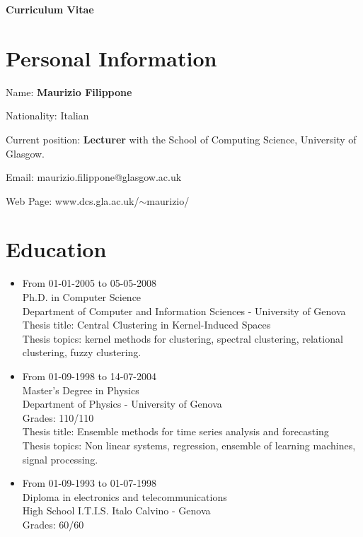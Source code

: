 \documentclass[a4paper,10pt]{article}
\begin{document}
\begin{center}
{\bf \huge Curriculum Vitae}
\end{center}

\section*{Personal Information}
\begin{description}
\item Name:               {\bf Maurizio Filippone}
\item Nationality:        Italian
\item Current position: 
  {\bf Lecturer} with the School of Computing Science, University of Glasgow.
\item Email:              maurizio.filippone@glasgow.ac.uk
\item Web Page:           www.dcs.gla.ac.uk/$\sim$maurizio/
\end{description}

\section*{Education}
\begin{itemize}
\item From 01-01-2005 to 05-05-2008 \\
Ph.D. in Computer Science \\
Department of Computer and Information Sciences - University of Genova \\
Thesis title: Central Clustering in Kernel-Induced Spaces \\
Thesis topics: kernel methods for clustering, spectral clustering, relational clustering, fuzzy clustering.

\item From 01-09-1998 to 14-07-2004  \\
Master's Degree in Physics  \\
Department of Physics - University of Genova \\
Grades: 110/110  \\
Thesis title: Ensemble methods for time series analysis and forecasting \\
Thesis topics: Non linear systems, regression, ensemble of learning machines, signal processing.

\item From 01-09-1993 to 01-07-1998  \\
Diploma in electronics and telecommunications \\
High School I.T.I.S. Italo Calvino - Genova \\
Grades: 60/60

\end{itemize}
\end{document}
